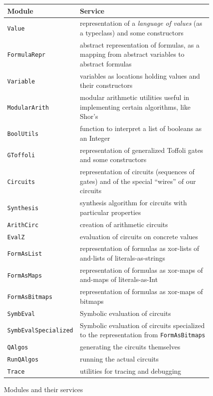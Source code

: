 \documentclass[sigplan,screen]{acmart}
\theoremstyle{definition}
\begin{document}
\begin{figure}[t]
\begin{tabular}{l | p{13cm}}
  \textbf{Module} & \textbf{Service} \\ \hline
  \texttt{Value} & representation of a \emph{language of values}
    (as a typeclass) and some constructors\\
  \texttt{FormulaRepr} & abstract representation of formulas, as
    a mapping from abstract variables to abstract formulas\\
  \texttt{Variable} & variables as locations holding values and
    their constructors\\
  \texttt{ModularArith} & modular arithmetic utilities useful in
    implementing certain algorithms, like Shor's\\
  \texttt{BoolUtils} & function to interpret a list of booleans as
    an Integer\\
  \texttt{GToffoli} & representation of generalized Toffoli gates
    and some constructors\\
  \texttt{Circuits} & representation of circuits (sequences of gates)
    and of the special ``wires'' of our circuits\\
  \texttt{Synthesis} & synthesis algorithm for circuits with particular
    properties\\
  \texttt{ArithCirc} & creation of arithmetic circuits\\
  \texttt{EvalZ} & evaluation of circuits on concrete values\\
  \texttt{FormAsList} & representation of formulas as xor-lists
    of and-lists of literals-as-strings\\
  \texttt{FormAsMaps} & representation of formulas as xor-maps
    of and-maps of literals-as-Int\\
  \texttt{FormAsBitmaps} & representation of formulas as xor-maps
    of bitmaps\\
  \texttt{SymbEval} & Symbolic evaluation of circuits\\
  \texttt{SymbEvalSpecialized} & Symbolic evaluation of circuits
    specialized to the representation from \texttt{FormAsBitmaps}\\
  \texttt{QAlgos} & generating the circuits themselves\\
  \texttt{RunQAlgos} & running the actual circuits \\
  \texttt{Trace} & utilities for tracing and debugging
\end{tabular}
  \caption{Modules and their services}
  \label{fig:modules}
\end{figure}
\end{document}

